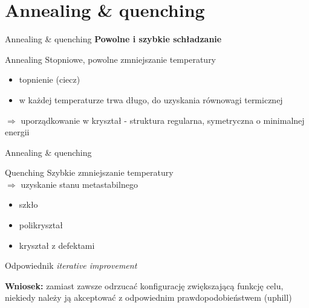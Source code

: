 \section{Annealing \& quenching}


	\begin{frame}{Annealing \& quenching}
		\textbf{Powolne i szybkie schładzanie}
		\begin{block}{Annealing}
			Stopniowe, powolne zmniejszanie temperatury
			\begin{itemize}
				\item topnienie (ciecz)
				\item w każdej temperaturze trwa długo, do uzyskania równowagi termicznej
			\end{itemize}
			$\Rightarrow$ uporządkowanie w kryształ - struktura regularna, symetryczna o minimalnej energii
		\end{block}
	\end{frame}


	\begin{frame}{Annealing \& quenching}
		\begin{block}{Quenching}
			Szybkie zmniejszanie temperatury \\
			$\Rightarrow$ uzyskanie stanu metastabilnego
			\begin{itemize}
				\item szkło
				\item polikryształ
				\item kryształ z defektami
			\end{itemize}
			Odpowiednik \textit{iterative improvement}
		\end{block}
		\textbf{Wniosek:} zamiast zawsze odrzucać konfigurację zwiększającą funkcję celu, niekiedy należy ją akceptować z odpowiednim prawdopodobieństwem (uphill)
	\end{frame}